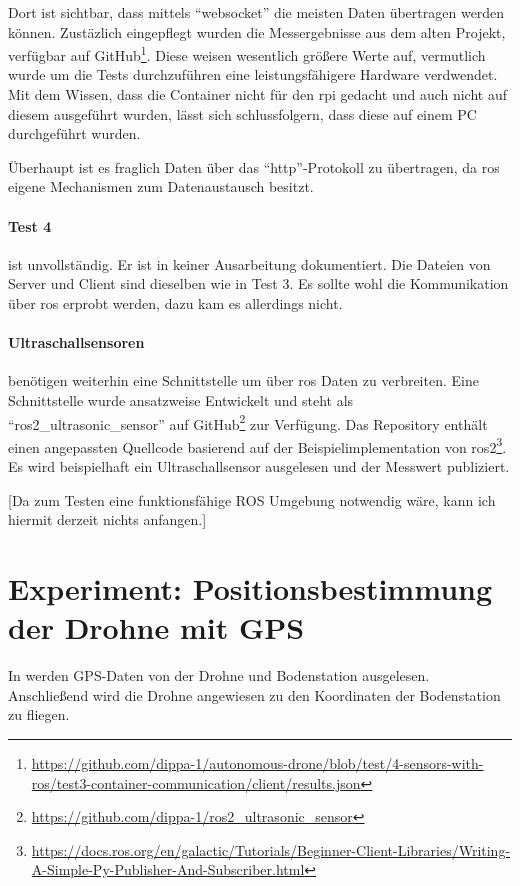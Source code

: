 Dort ist sichtbar, dass mittels \enquote{websocket} die meisten Daten übertragen werden können. Zustäzlich eingepflegt wurden die Messergebnisse aus dem alten Projekt, verfügbar auf GitHub\footnote{\url{https://github.com/dippa-1/autonomous-drone/blob/test/4-sensors-with-ros/test3-container-communication/client/results.json}}. Diese weisen wesentlich größere Werte auf, vermutlich wurde um die Tests durchzuführen eine leistungsfähigere Hardware verdwendet. Mit dem Wissen, dass die Container nicht für den \gls{rpi} gedacht und auch nicht auf diesem ausgeführt wurden, lässt sich schlussfolgern, dass diese auf einem PC durchgeführt wurden.

Überhaupt ist es fraglich Daten über das \enquote{http}-Protokoll zu übertragen, da \gls{ros} eigene Mechanismen zum Datenaustausch besitzt.

\paragraph*{Test 4} ist unvollständig. Er ist in keiner Ausarbeitung dokumentiert. Die Dateien von Server und Client sind dieselben wie in Test 3. Es sollte wohl die Kommunikation über \acrshort{ros} erprobt werden, dazu kam es allerdings nicht.

\paragraph*{Ultraschallsensoren} benötigen weiterhin eine Schnittstelle um über \acrshort{ros} Daten zu verbreiten. Eine Schnittstelle wurde ansatzweise Entwickelt und steht als \enquote{ros2\_ultrasonic\_sensor} auf GitHub\footnote{\url{https://github.com/dippa-1/ros2_ultrasonic_sensor}} zur Verfügung. Das Repository enthält einen angepassten Quellcode basierend auf der Beispielimplementation von \acrshort{ros}2\footnote{\url{https://docs.ros.org/en/galactic/Tutorials/Beginner-Client-Libraries/Writing-A-Simple-Py-Publisher-And-Subscriber.html}}. Es wird beispielhaft ein Ultraschallsensor ausgelesen und der Messwert publiziert.

[Da zum Testen eine funktionsfähige ROS Umgebung notwendig wäre, kann ich hiermit derzeit nichts anfangen.]

\section{Experiment: Positionsbestimmung der Drohne mit GPS}
In \cite[Kapitel 6.10; 7.4 und folgende]{wirthErweiterungBestehendenDrohne2022a} werden GPS-Daten von der Drohne und Bodenstation ausgelesen. Anschließend wird die Drohne angewiesen zu den Koordinaten der Bodenstation zu fliegen.

